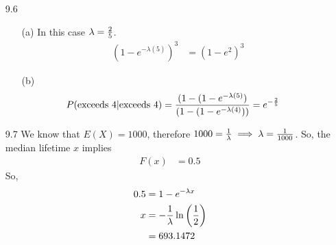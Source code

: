 \documentclass[english, 11pt]{article}
\begin{document}
\begin{itemize}
\item[9.6]
\begin{itemize}
  \item[(a)] In this case $\lambda = \frac{2}{5}$.
  \begin{align*}
    (1 - e^{-\lambda(5)})^3 & = (1 - e^{2})^3
  \end{align*}
  \item[(b)]
  \begin{align*}
    P(\mbox{exceeds 4} | \mbox{exceeds 4}) & = \frac{(1-(1 - e^{-\lambda(5)})}{(1-(1 - e^{-\lambda(4)}))} = e^{-\frac{2}{5}}
  \end{align*}
\end{itemize}

\item[9.7]
We know that $E(X) = 1000$, therefore $1000 = \frac{1}{\lambda} \implies \lambda = \frac{1}{1000}$. So, the median lifetime $x$ implies
\begin{align*}
  F(x) & = 0.5
\end{align*}
So,
\begin{align*}
  0.5 & = 1 - e^{-\lambda x} \\
  x & = - \frac{1}{\lambda} \ln \left( \frac{1}{2} \right) \\
  & = 693.1472
\end{align*}


\end{itemize}
\end{document}

